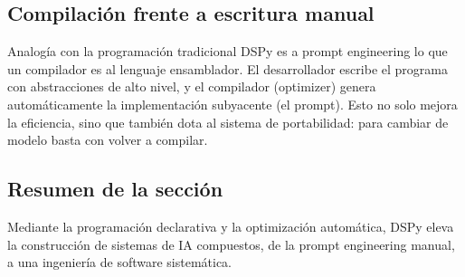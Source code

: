 \subsection{Compilación frente a escritura manual}

\begin{knowledgebox}{Analogía con la programación tradicional}
DSPy es a prompt engineering lo que un compilador es al lenguaje ensamblador. El desarrollador escribe el programa con abstracciones de alto nivel, y el compilador (optimizer) genera automáticamente la implementación subyacente (el prompt). Esto no solo mejora la eficiencia, sino que también dota al sistema de portabilidad: para cambiar de modelo basta con volver a compilar.
\end{knowledgebox}

\subsection{Resumen de la sección}

Mediante la programación declarativa y la optimización automática, DSPy eleva la construcción de sistemas de IA compuestos, de la prompt engineering manual, a una ingeniería de software sistemática.


